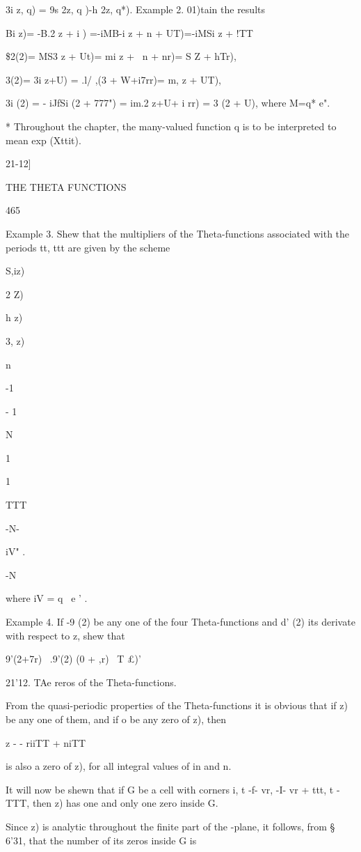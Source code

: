 3i z, q) = 9s 2z, q )-h 2z, q*). Example 2. 01)tain the results

Bi z)= -B.2 z + i ) =-iMB-i z + n + UT)=-iMSi z + !TT\

\$2(2)= MS3 z + Ut)= mi z + \ n + nr)= S Z + hTr),

 3(2)= 3i z+U) = .l/ ,(3 + W+i7rr)= m, z + UT),

3i (2) = - iJfSi (2 + 777") = im.2 z+U+ i rr) = 3 (2 + U), where M=q*
e".

* Throughout the chapter, the many-valued function q is to be
interpreted to mean exp (Xttit).

21-12]

THE THETA FUNCTIONS

465

Example 3. Shew that the multipliers of the Theta-functions associated
with the periods tt, ttt are given by the scheme

S,iz)

 2 Z)

h z)

3, z)

n

-1

- 1

N

1

1

TTT

-N-

iV" .

-N

where iV = q~ e ' .

Example 4. If -9 (2) be any one of the four Theta-functions and d' (2)
its derivate with respect to z, shew that

 9'(2+7r) \ .9'(2) (0 + ,r) ~T £)'

21'12. TAe reros of the Theta-functions.

From the quasi-periodic properties of the Theta-functions it is
obvious that if z) be any one of them, and if o be any zero of z),
then

z - - riiTT + niTT

is also a zero of z), for all integral values of in and n.

It will now be shewn that if G be a cell with corners i, t -f- vr, -I-
vr + ttt, t - TTT, then z) has one and only one zero inside G.

Since z) is analytic throughout the finite part of the -plane, it
follows, from § 6'31, that the number of its zeros inside G is

